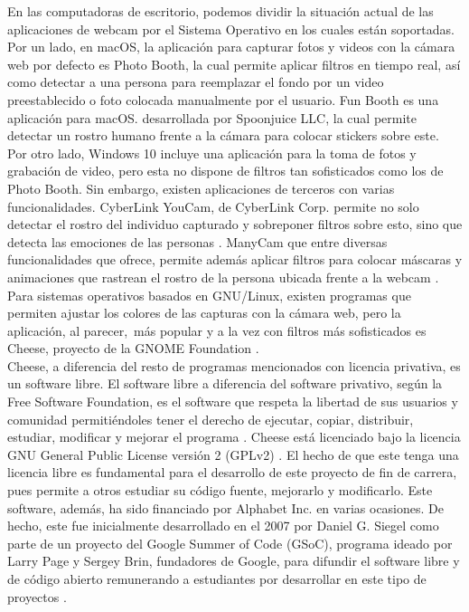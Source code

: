 \documentclass[a4paper,openright,12pt]{report}
\begin{document}
En las computadoras de escritorio, podemos dividir la situación actual de las
aplicaciones de webcam por el Sistema Operativo en los cuales están soportadas.
Por un lado, en macOS, la aplicación para capturar fotos y videos con la cámara
web por defecto es Photo Booth, la cual permite aplicar filtros en tiempo real,
así como detectar a una persona para reemplazar el fondo por un video
preestablecido o foto colocada manualmente por el usuario. Fun Booth es una
aplicación para macOS. desarrollada por Spoonjuice LLC, la cual permite detectar
un rostro humano frente a la cámara para colocar stickers sobre este. Por otro
lado, Windows 10 incluye una aplicación para la toma de fotos y grabación de
video, pero esta no dispone de filtros tan sofisticados como los de Photo Booth.
Sin embargo, existen aplicaciones de terceros con varias funcionalidades.
CyberLink YouCam, de CyberLink Corp. permite no solo detectar el rostro del
individuo capturado y sobreponer filtros sobre esto, sino que detecta las
emociones de las personas \cite{YouCam7A82}⁠. ManyCam que entre diversas
funcionalidades que ofrece, permite además aplicar filtros para colocar máscaras
y animaciones que rastrean el rostro de la persona ubicada frente a la webcam
\cite{Webcamso75}. Para sistemas operativos basados en GNU/Linux, existen
programas que permiten ajustar los colores de las capturas con la cámara web,
pero la aplicación, al parecer, más popular y a la vez con filtros más
sofisticados es Cheese, proyecto de la GNOME Foundation \cite{AppsChee13}.⁠\\

Cheese, a diferencia del resto de programas mencionados con licencia privativa,
es un software libre. El software libre a diferencia del software privativo,
según la Free Software Foundation, es el software que respeta la libertad de sus
usuarios y comunidad permitiéndoles tener el derecho de ejecutar, copiar,
distribuir, estudiar, modificar y mejorar el programa \cite{whatIsFreeSoftware}⁠.
Cheese está licenciado bajo la licencia GNU General Public License versión 2
(GPLv2) \cite{cheeseLicense}⁠.
El hecho de que este tenga una licencia libre es fundamental para el desarrollo
de este proyecto de fin de carrera, pues permite a otros estudiar su código
fuente, mejorarlo y modificarlo. Este software, además, ha sido financiado por
Alphabet Inc. en varias ocasiones. De hecho, este fue inicialmente desarrollado
en el 2007 por Daniel G. Siegel como parte de un proyecto del Google Summer of
Code (GSoC), programa ideado por Larry Page y Sergey Brin, fundadores de Google,
para difundir el software libre y de código abierto remunerando a estudiantes
por desarrollar en este tipo de proyectos \cite{gsoc1}.\\
\end{document}
